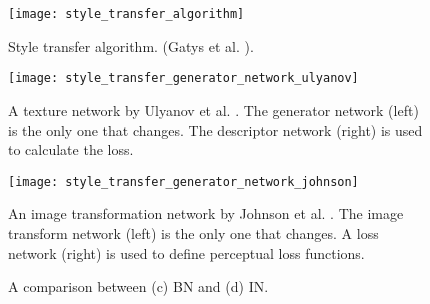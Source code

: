 \begin{figure}
	\centering
	\texttt{[image: style\_transfer\_algorithm]}%
	\caption{
		Style transfer algorithm. (Gatys et al. \cite{Gatys2016}).
	}
	\label{fig:style_transfer_algorithm}
\end{figure}
\begin{figure}
	\centering
	\texttt{[image: style\_transfer\_generator\_network\_ulyanov]}%
	\caption{
		A texture network by Ulyanov et al. \cite{Ulyanov2016}.
		The generator network (left) is the only one that changes.
		The descriptor network (right) is used to calculate the loss.
	}
	\label{fig:style_transfer_generator_network_ulyanov}
\end{figure}
\begin{figure}
	\centering
	\texttt{[image: style\_transfer\_generator\_network\_johnson]}%
	\caption{
		An image transformation network by Johnson et al. \cite{Johnson2016}.
		The image transform network (left) is the only one that changes.
		A loss network (right) is used to define perceptual loss functions.
	}
	\label{fig:style_transfer_generator_network_johnson}
\end{figure}
\begin{figure}
	\centering
	\caption{A comparison between (c) \gls{BN} and (d) \gls{IN}.\cite{Ulyanov2017}}
	\label{fig:style_transfer_ulyanov_BN_IN_comparison}
\end{figure}
